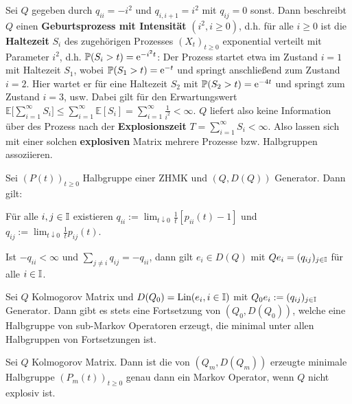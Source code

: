 \documentclass[a4paper]{paper}
\begin{document}
\begin{moti}Sei $Q$ gegeben durch $q_{ii}=-i^2$ und $q_{i,i+1}=i^2$ mit $q_{ij}=0$ sonst. Dann beschreibt $Q$ einen \textbf{Geburtsprozess mit Intensität} $(i^2, i\geq0)$, d.h. für alle $i\geq0$ ist die  \textbf{Haltezeit} $S_i$ des zugehörigen Prozesses $(X_t)_{t\geq0}$ exponential verteilt mit Parameter $i^2$, d.h. $\P(S_i>t)=\text e^{-i^2 t}$: Der Prozess startet etwa im Zustand $i=1$ mit Haltezeit $S_1$, wobei $\P(S_1>t)=\text e^{-t}$ und springt anschließend zum Zustand $i=2$. Hier wartet er für eine Haltezeit $S_2$ mit $\P(S_2>t)=\text e^{-4t}$ und springt zum Zustand $i=3$, usw. Dabei gilt für den Erwartungswert $\mathbb E\big[\sum_{i=1}^\infty S_i\big]\leq\sum_{i=1}^\infty \mathbb E[S_i]=\sum_{i=1}^\infty\frac{1}{i^2}< \infty$. $Q$ liefert also keine Information über des Prozess nach der \textbf{Explosionszeit} $T=\sum_{i=1}^\infty S_i<\infty$. Also lassen sich mit einer solchen \textbf{explosiven} Matrix mehrere Prozesse bzw. Halbgruppen assoziieren.
\end{moti}

  
\begin{prop} Sei $(P(t))_{t\geq0}$ Halbgruppe einer ZHMK und $(Q,D(Q))$ Generator. Dann gilt:
\begin{compactenum}
\item  Für alle $i,j\in\I$ existieren $q_{ii}:=\lim_{t\downarrow 0}\frac{1}{t}[p_{ii}(t)-1]$ und $q_{ij}:=\lim_{t\downarrow 0}\frac{1}{t}p_{ij}(t)$.
\item  Ist $-q_{ii}< \infty$ und  $\sum_{j\neq i}q_{ij}=-q_{ii}$, dann gilt $e_i\in D(Q)$ mit $Qe_i=(q_{ij})_{j\in\I}$ für alle $i\in\I$.
\end{compactenum}\end{prop}
  

\begin{fsatz}Sei $Q$ Kolmogorov Matrix und $D(Q_0)=\textnormal{Lin}(e_i,i\in\I)$ mit $Q_0 e_i:=(q_{ij})_{j\in\I}$ Generator. Dann gibt es stets eine Fortsetzung von $(Q_0, D(Q_0))$, welche eine Halbgruppe von sub-Markov Operatoren erzeugt, die minimal unter allen Halbgruppen von Fortsetzungen ist.
\end{fsatz}

\begin{fsatz}
  Sei $Q$ Kolmogorov Matrix. Dann ist die von $(Q_m,D(Q_m))$ erzeugte minimale Halbgruppe $(P_m(t))_{t\geq0}$ genau dann ein Markov Operator, wenn $Q$ nicht explosiv ist.
\end{fsatz}
\end{document}
